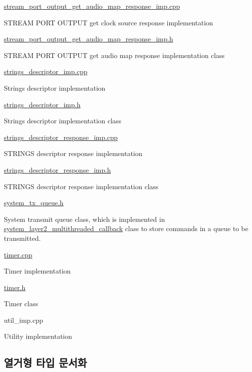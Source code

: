 \hyperlink{stream__port__output__get__audio__map__response__imp_8cpp}{stream\+\_\+port\+\_\+output\+\_\+get\+\_\+audio\+\_\+map\+\_\+response\+\_\+imp.\+cpp}

S\+T\+R\+E\+AM P\+O\+RT O\+U\+T\+P\+UT get clock source response implementation

\hyperlink{stream__port__output__get__audio__map__response__imp_8h}{stream\+\_\+port\+\_\+output\+\_\+get\+\_\+audio\+\_\+map\+\_\+response\+\_\+imp.\+h}

S\+T\+R\+E\+AM P\+O\+RT O\+U\+T\+P\+UT get audio map response implementation class

\hyperlink{strings__descriptor__imp_8cpp}{strings\+\_\+descriptor\+\_\+imp.\+cpp}

Strings descriptor implementation

\hyperlink{strings__descriptor__imp_8h}{strings\+\_\+descriptor\+\_\+imp.\+h}

Strings descriptor implementation class

\hyperlink{strings__descriptor__response__imp_8cpp}{strings\+\_\+descriptor\+\_\+response\+\_\+imp.\+cpp}

S\+T\+R\+I\+N\+GS descriptor response implementation

\hyperlink{strings__descriptor__response__imp_8h}{strings\+\_\+descriptor\+\_\+response\+\_\+imp.\+h}

S\+T\+R\+I\+N\+GS descriptor response implementation class

\hyperlink{system__tx__queue_8h}{system\+\_\+tx\+\_\+queue.\+h}

System transmit queue class, which is implemented in \hyperlink{classavdecc__lib_1_1system__layer2__multithreaded__callback}{system\+\_\+layer2\+\_\+multithreaded\+\_\+callback} class to store commands in a queue to be transmitted.

\hyperlink{timer_8cpp}{timer.\+cpp}

Timer implementation

\hyperlink{timer_8h}{timer.\+h}

Timer class

util\+\_\+imp.\+cpp

Utility implementation 

\subsection{열거형 타입 문서화}
